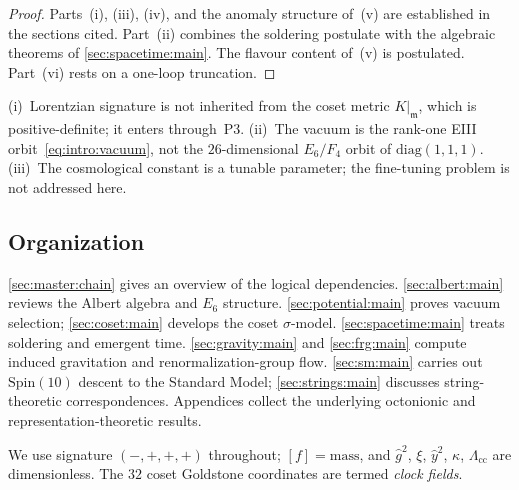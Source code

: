 \begin{proof}
Parts~(i), (iii), (iv), and the anomaly structure of~(v) are established in the
sections cited. Part~(ii) combines the soldering postulate with the algebraic
theorems of \autoref{sec:spacetime:main}. The flavour content of~(v) is
postulated. Part~(vi) rests on a one-loop truncation.
\end{proof}

\begin{remark}[Scope]\label{rem:intro:caveats}
(i)~Lorentzian signature is not inherited from the coset metric $K|_{\mathfrak{m}}$,
which is positive-definite; it enters through~\textnormal{P3}.
(ii)~The vacuum is the rank-one EIII orbit~\eqref{eq:intro:vacuum}, not the
$26$-dimensional $E_6/F_4$ orbit of $\mathrm{diag}(1,1,1)$.
(iii)~The cosmological constant is a tunable parameter; the fine-tuning problem is
not addressed here.
\end{remark}

\subsection{Organization}
\label{sec:intro:roadmap}

\autoref{sec:master:chain} gives an overview of the logical dependencies.
\autoref{sec:albert:main} reviews the Albert algebra and $E_6$ structure.
\autoref{sec:potential:main} proves vacuum selection; \autoref{sec:coset:main}
develops the coset $\sigma$-model. \autoref{sec:spacetime:main} treats soldering
and emergent time. \autoref{sec:gravity:main} and \autoref{sec:frg:main} compute
induced gravitation and renormalization-group flow. \autoref{sec:sm:main}
carries out $\mathrm{Spin}(10)$ descent to the Standard Model;
\autoref{sec:strings:main} discusses string-theoretic correspondences. Appendices
collect the underlying octonionic and representation-theoretic results.

We use signature $(-,+,+,+)$ throughout; $[f]=\mathrm{mass}$, and
$\hat g^{2}$, $\xi$, $\hat y^{2}$, $\kappa$, $\Lambda_{\mathrm{cc}}$ are
dimensionless. The $32$ coset Goldstone coordinates are termed \emph{clock fields}.